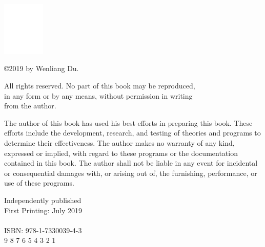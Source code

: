 
\thispagestyle{empty}



\includegraphics[width=0.15\textwidth]{empty.pdf}\par\vspace{3cm}

\noindent
\copyright 2019 by Wenliang Du.

\vspace{1cm}
\noindent
All rights reserved. No part of this book may be reproduced,\\ 
in any form or by any means, without permission in writing\\ 
from the author.

\vspace{1cm}
\noindent
The author of this book has used his best efforts in preparing this book. These efforts
include the development, research, and testing of theories and programs to determine 
their effectiveness. The author makes no warranty of any kind, expressed or implied,
with regard to these programs or the documentation contained in this book. The author
shall not be liable in any event for incidental or consequential damages with, or arising out
of, the furnishing, performance, or use of these programs. 


\vspace{1cm}
\noindent
Independently published
\\
First Printing: July 2019\\
\\
ISBN: 978-1-7330039-4-3\\


\vspace{1cm}
 9 8 7 6 5 4 3 2 1
 


